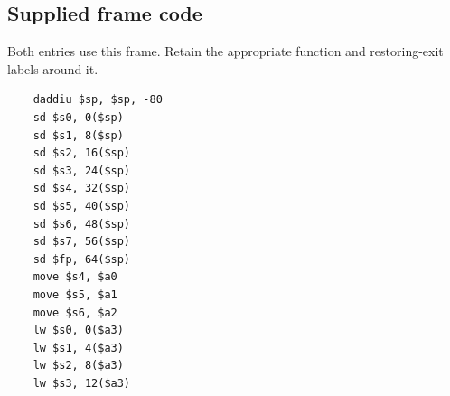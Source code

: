 \subsection*{Supplied frame code}
Both entries use this frame. Retain the appropriate function and restoring-exit labels around it.
\begin{verbatim}
    daddiu $sp, $sp, -80
    sd $s0, 0($sp)
    sd $s1, 8($sp)
    sd $s2, 16($sp)
    sd $s3, 24($sp)
    sd $s4, 32($sp)
    sd $s5, 40($sp)
    sd $s6, 48($sp)
    sd $s7, 56($sp)
    sd $fp, 64($sp)
    move $s4, $a0
    move $s5, $a1
    move $s6, $a2
    lw $s0, 0($a3)
    lw $s1, 4($a3)
    lw $s2, 8($a3)
    lw $s3, 12($a3)
\end{verbatim}
